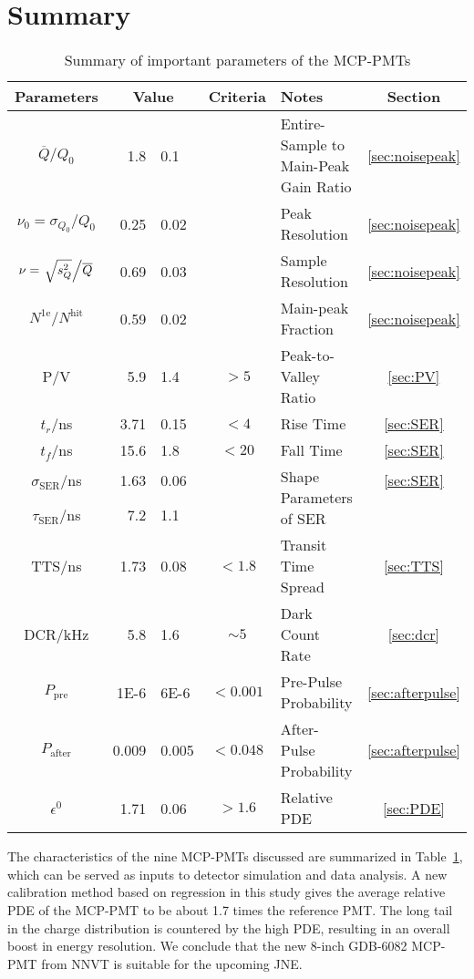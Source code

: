 \section{Summary}
\label{Summary}
\begin{table}
    \centering
    \caption{Summary of important parameters of the MCP-PMTs}
    \label{tab:summary}
    \begin{tabularx}{\textwidth}{c|r @{$\pm$} l cXc}
        \hline\hline
        Parameters&\multicolumn{2}{c}{Value}&Criteria&Notes&Section\\
        \hline
        $\overline{Q}/Q_0$&1.8&0.1&&Entire-Sample to Main-Peak Gain Ratio&\ref{sec:noisepeak}\\
        $\nu_0=\sigma_{Q_0}/Q_0$&0.25&0.02&&Peak Resolution&\ref{sec:noisepeak}\\
        $\nu=\left.\sqrt{s^2_{Q}}\middle/\overline{Q}\right.$&0.69&0.03&&Sample Resolution&\ref{sec:noisepeak}\\
        $N^{\mathrm{1e}}/N^{\mathrm{hit}}$&0.59&0.02&&Main-peak Fraction&\ref{sec:noisepeak}\\
        P/V&5.9&1.4&$>5$&Peak-to-Valley Ratio&\ref{sec:PV}\\
        $t_r$/ns&3.71&0.15&$<4$&Rise Time&\ref{sec:SER}\\
        $t_f$/ns&15.6&1.8&$<20$&Fall Time&\ref{sec:SER}\\
        \hline
        $\sigma_{\mathrm{SER}}$/ns&1.63&0.06&& \multirow{2}{=}{Shape Parameters of SER} & \ref{sec:SER}\\
        $\tau_{\mathrm{SER}}$/ns&7.2&1.1&&&\\
        \hline
        TTS/ns&1.73&0.08&$<1.8$&Transit Time Spread &\ref{sec:TTS}\\
        DCR/kHz&5.8&1.6&$\sim 5$&Dark Count Rate&\ref{sec:dcr}\\
        $P_{\mathrm{pre}}$&1E-6&6E-6&$<0.001$&Pre-Pulse Probability&\ref{sec:afterpulse}\\
        $P_{\mathrm{after}}$&0.009&0.005&$<0.048$&After-Pulse Probability&\ref{sec:afterpulse}\\
        $\epsilon^0$&1.71&0.06&$>1.6$&Relative PDE&\ref{sec:PDE}\\
        \hline\hline
    \end{tabularx}
\end{table}

The characteristics of the nine MCP-PMTs discussed are summarized in Table~\ref{tab:summary}, which can be served as inputs to detector simulation and data analysis. A new calibration method based on regression in this study gives the average relative PDE of the MCP-PMT to be about 1.7 times the reference PMT. The long tail in the charge distribution is countered by the high PDE, resulting in an overall boost in energy resolution. We conclude that the new 8-inch GDB-6082 MCP-PMT from NNVT is suitable for the upcoming JNE.